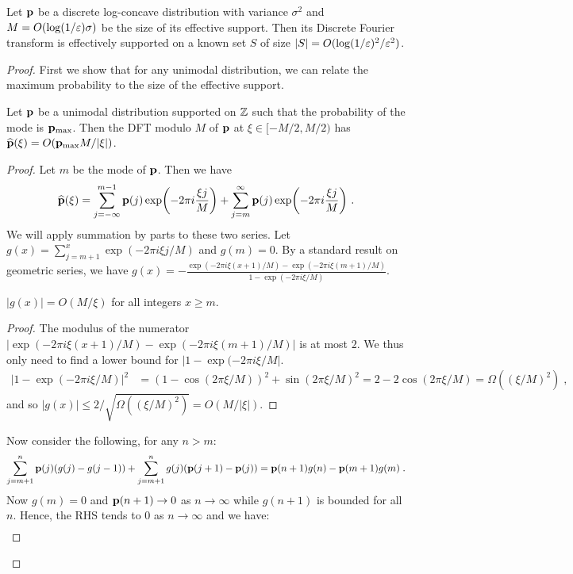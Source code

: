 \begin{proposition} \label{prop:log-concave-sparse-FT} 
Let $\mathbf{p}$ be a discrete log-concave distribution with variance $\sigma^2$ and  $M = O(\log(1/\varepsilon) \sigma)$ be the size of its effective support. 
Then its Discrete Fourier transform is effectively supported on a known set $S$ of size $|S|=O(\log(1/\varepsilon)^2/\varepsilon^2)$. 
\end{proposition}
\begin{proof}
First we show that for any unimodal distribution, we can relate the maximum probability to the size of the effective support.

\begin{lemma} 
Let $\mathbf{p}$ be a unimodal distribution supported on $\mathbb{Z}$ such that the probability of the mode is $\mathbf{p}_{\max}$. 
Then the DFT modulo $M$ of $\mathbf{p}$ at $\xi \in [-M/2,M/2)$ has $\widehat{\mathbf{p}}(\xi)=O(\mathbf{p}_{\max} M/|\xi|)$.
\end{lemma}
\begin{proof}
Let $m$ be the mode of $\mathbf{p}$. Then we have 
\[
  \widehat{\mathbf{p}}(\xi)=\sum_{j=-\infty}^{m-1} \mathbf{p}(j) \exp\!\left(-2\pi i \frac{\xi j}{M}\right) + \sum_{j=m}^\infty \mathbf{p}(j) \exp\!\left(-2\pi i \frac{\xi j}{M}\right)\,.
\]
We will apply summation by parts to these two series. 
Let $g(x) = \sum_{j=m+1}^x \exp(-2\pi i \xi j/M)$ and $g(m)=0$. 
By a standard result on geometric series, we have $g(x)= -\frac{\exp(-2\pi i \xi (x+1)/M) - \exp(-2\pi i \xi (m+1)/M)}{1- \exp(-2\pi i \xi/M)}$.
\begin{claim} 
$|g(x)| = O(M/\xi)$ for all integers $x \geq m$. 
\end{claim}
\begin{proof}
The modulus of the numerator $|\exp(-2\pi i \xi (x+1)/M) - \exp(-2\pi i \xi (m+1)/M)|$ is at most $2$. 
We thus only need to find a lower bound for $|1- \exp(-2\pi i \xi/M|$.
\begin{align*}
|1- \exp(-2\pi i \xi/M)|^2 & = (1-\cos(2\pi\xi/M))^2 + \sin(2\pi\xi/M)^2 
 = 2 - 2 \cos(2\pi\xi/M) 
 = \Omega((\xi/M)^2) \;,
\end{align*}
and so $|g(x)| \leq 2/\sqrt{\Omega((\xi/M)^2)}=O(M/|\xi|)$.
\end{proof}
\noindent Now consider the following, for any $n > m$:
\[
  \sum_{j=m+1}^n \mathbf{p}(j) (g(j)-g(j-1)) + \sum_{j=m+1}^n g(j) (\mathbf{p}(j+1)-\mathbf{p}(j))  = \mathbf{p}(n+1)g(n)-\mathbf{p}(m+1)g(m) \; .
\]
Now $g(m)=0$ and $\mathbf{p}(n+1) \rightarrow 0$ as $n \rightarrow \infty$ while $g(n+1)$ is bounded for all $n$. 
Hence, the RHS tends to $0$ as $n \rightarrow \infty$ and we have:
\begin{align*} 

\end{align*}
\end{proof}
\end{proof}
